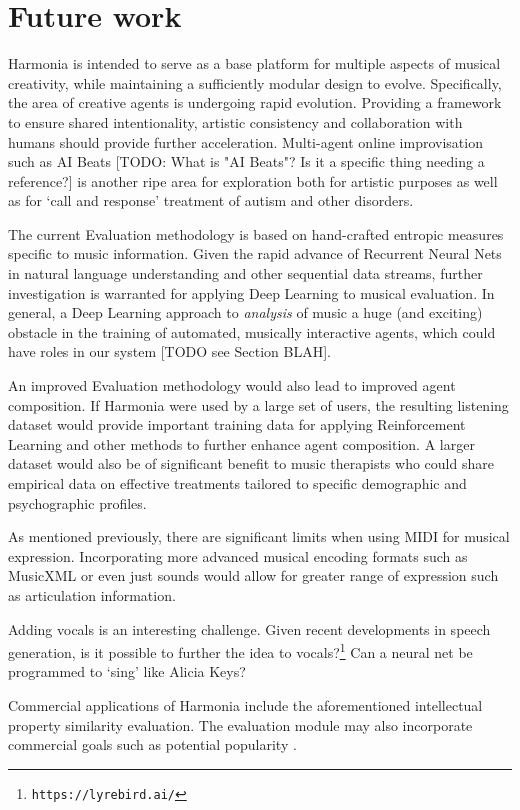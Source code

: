 \documentclass[final,authoryear,5p,times,twocolumn]{elsarticle}
\begin{document}
\section {Future work}

Harmonia is intended to serve as a base platform for multiple aspects of musical creativity, while maintaining a sufficiently modular design to evolve. Specifically, the area of creative agents is undergoing rapid evolution. Providing a framework to ensure shared intentionality, artistic consistency and collaboration with humans should provide further acceleration. Multi-agent online improvisation such as AI Beats [TODO: What is "AI Beats"? Is it a specific thing needing a reference?] is another ripe area for exploration both for artistic purposes as well as for `call and response' treatment of autism and other disorders. 

The current Evaluation methodology is based on hand-crafted entropic measures specific to music information. Given the rapid advance of Recurrent Neural Nets in natural language understanding and other sequential data streams, further investigation is warranted for applying Deep Learning to musical evaluation. In general, a Deep Learning approach to \textit{analysis} of music a huge (and exciting) obstacle in the training of automated, musically interactive agents, which could have roles in our system [TODO see Section BLAH].

An improved Evaluation methodology would also lead to improved agent composition. If Harmonia were used by a large set of users, the resulting listening dataset would provide important training data for applying Reinforcement Learning and other methods to further enhance agent composition. A larger dataset would also be of significant benefit to music therapists who could share empirical data on effective treatments tailored to specific demographic and psychographic profiles.

As mentioned previously, there are significant limits when using MIDI for musical expression. Incorporating more advanced musical encoding formats such as MusicXML or even just sounds would allow for greater range of expression such as articulation information.

Adding vocals is an interesting challenge. Given recent developments in speech generation, is it possible to further the idea to vocals?\footnote{\texttt{https://lyrebird.ai/}} Can a neural net be programmed to `sing' like Alicia Keys? 

Commercial applications of Harmonia include the aforementioned intellectual property similarity evaluation. The evaluation module may also incorporate commercial goals such as potential popularity \citep{phampredicting}.
\end{document}
